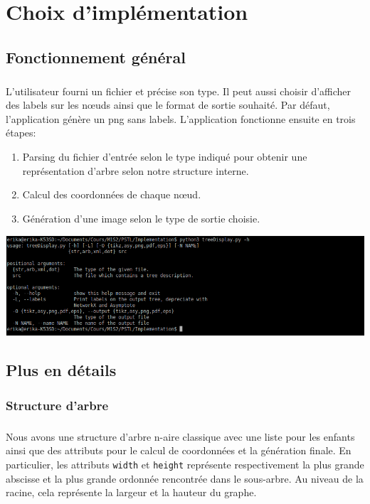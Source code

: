 \chapter{Choix d'implémentation}

\section{Fonctionnement général}

\paragraph{}L'utilisateur fourni un fichier et précise son type. Il peut aussi choisir d'afficher des labels sur les n\oe uds ainsi que le format de sortie souhaité. Par défaut, l'application génère un png sans labels. L'application fonctionne ensuite en trois étapes:
\begin{enumerate}
	\item Parsing du fichier d'entrée selon le type indiqué pour obtenir une représentation d'arbre selon notre structure interne.
	\item Calcul des coordonnées de chaque n\oe ud.
	\item Génération d'une image selon le type de sortie choisie.
\end{enumerate}

\begin{center}
\includegraphics[width=\columnwidth]{usage}
\end{center}

\section{Plus en détails}

	\subsection{Structure d'arbre}
	
\paragraph{}Nous avons une structure d'arbre n-aire classique avec une liste pour les enfants ainsi que des attributs pour le calcul de coordonnées et la génération finale. En particulier, les attributs \verb|width| et \verb|height| représente respectivement la plus grande abscisse et la plus grande ordonnée rencontrée dans le sous-arbre. Au niveau de la racine, cela représente la largeur et la hauteur du graphe.
	
